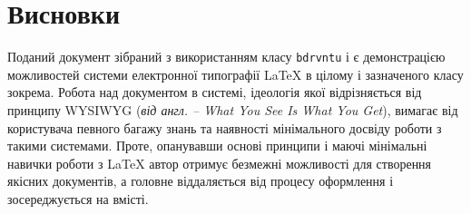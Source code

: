 \chapter*{Висновки}

Поданий документ зібраний з використанням класу \verb|bdrvntu| і є демонстрацією можливостей системи електронної типографії
{\LaTeX} в цілому і зазначеного класу зокрема. Робота над документом в системі, ідеологія якої відрізняється від принципу
WYSIWYG (\textit{від англ. -- What You See Is What You Get}), вимагає від користувача певного багажу знань та наявності
мінімального досвіду роботи з такими системами. Проте, опанувавши основі принципи і маючі мінімальні навички роботи з {\LaTeX}
автор отримує безмежні можливості для створення якісних документів, а головне віддаляється від процесу оформлення і 
зосереджується на вмісті. 